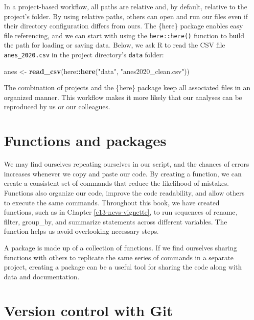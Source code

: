 \documentclass[
]{krantz}
\makeatletter
\newenvironment{Shaded}{\begin{snugshade}}{\end{snugshade}}
\newcommand{\FunctionTok}[1]{\textcolor[rgb]{0.27,0.27,0.27}{\textbf{#1}}}
\newcommand{\NormalTok}[1]{#1}
\newcommand{\OtherTok}[1]{\textcolor[rgb]{0.37,0.37,0.37}{#1}}
\newcommand{\SpecialCharTok}[1]{\textcolor[rgb]{0.43,0.43,0.43}{\textbf{#1}}}
\newcommand{\StringTok}[1]{\textcolor[rgb]{0.5,0.5,0.5}{#1}}
\newenvironment{kframe}{%
\medskip{}
\setlength{\fboxsep}{.8em}
 \def\at@end@of@kframe{}%
 \ifinner\ifhmode%
  \def\at@end@of@kframe{\end{minipage}}%
  \begin{minipage}{\columnwidth}%
 \fi\fi%
 \def\FrameCommand##1{\hskip\@totalleftmargin \hskip-\fboxsep
 \colorbox{shadecolor}{##1}\hskip-\fboxsep
     \hskip-\linewidth \hskip-\@totalleftmargin \hskip\columnwidth}%
 \MakeFramed {\advance\hsize-\width
   \@totalleftmargin\z@ \linewidth\hsize
   \@setminipage}}%
 {\par\unskip\endMakeFramed%
 \at@end@of@kframe}
\renewenvironment{Shaded}{\begin{kframe}}{\end{kframe}}
\makeatother
\begin{document}
In a project-based workflow, all paths are relative and, by default, relative to the project's folder. By using relative paths, others can open and run our files even if their directory configuration differs from ours. The \{here\} package enables easy file referencing, and we can start with using the \texttt{here::here()} function to build the path for loading or saving data. Below, we ask R to read the CSV file \texttt{anes\_2020.csv} in the project directory's \texttt{data} folder:

\begin{Shaded}
\begin{Highlighting}[]
\NormalTok{anes }\OtherTok{\textless{}{-}}
  \FunctionTok{read\_csv}\NormalTok{(here}\SpecialCharTok{::}\FunctionTok{here}\NormalTok{(}\StringTok{"data"}\NormalTok{, }\StringTok{"anes2020\_clean.csv"}\NormalTok{))}
\end{Highlighting}
\end{Shaded}

The combination of projects and the \{here\} package keep all associated files in an organized manner. This workflow makes it more likely that our analyses can be reproduced by us or our colleagues.

\hypertarget{functions-and-packages}{%
\section{Functions and packages}\label{functions-and-packages}}

We may find ourselves repeating ourselves in our script, and the chances of errors increases whenever we copy and paste our code. By creating a function, we can create a consistent set of commands that reduce the likelihood of mistakes. Functions also organize our code, improve the code readability, and allow others to execute the same commands. Throughout this book, we have created functions, such as in Chapter \ref{c13-ncvs-vignette}, to run sequences of rename, filter, group\_by, and summarize statements across different variables. The function helps us avoid overlooking necessary steps.

A package is made up of a collection of functions. If we find ourselves sharing functions with others to replicate the same series of commands in a separate project, creating a package can be a useful tool for sharing the code along with data and documentation.

\hypertarget{version-control-with-git}{%
\section{Version control with Git}\label{version-control-with-git}}
\end{document}
